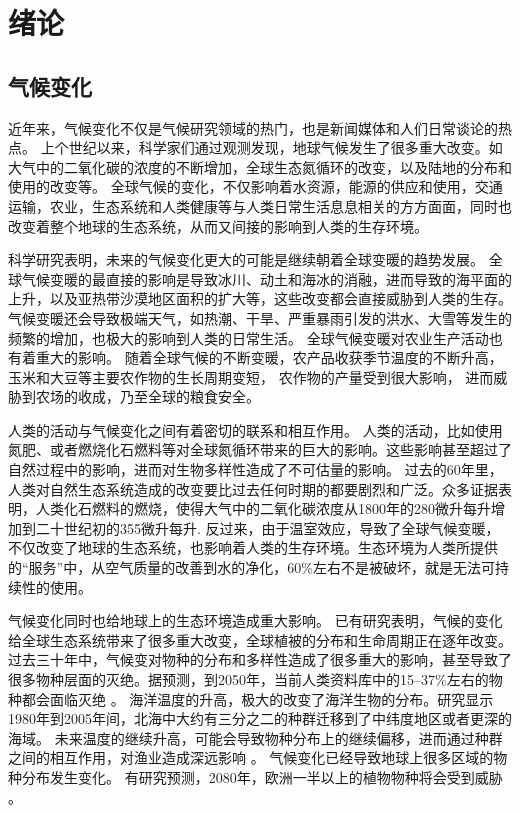\chapter{绪论}
\label{cha:intro}

\section{气候变化}

近年来，气候变化不仅是气候研究领域的热门，也是新闻媒体和人们日常谈论的热点。
上个世纪以来，科学家们通过观测发现，地球气候发生了很多重大改变。如大气中的二氧化碳的浓度的不断增加，全球生态氮循环的改变，以及陆地的分布和使用的改变等\cite{vitousek1994beyond}。
全球气候的变化，不仅影响着水资源，能源的供应和使用，交通运输，农业，生态系统和人类健康等与人类日常生活息息相关的方方面面\cite{karl2009global}，同时也改变着整个地球的生态系统，从而又间接的影响到人类的生存环境。



科学研究表明，未来的气候变化更大的可能是继续朝着全球变暖的趋势发展\cite{solomon2007climate,stocker2013ipcc}。
全球气候变暖的最直接的影响是导致冰川、动土和海冰的消融，进而导致的海平面的上升，以及亚热带沙漠地区面积的扩大等，这些改变都会直接威胁到人类的生存。
气候变暖还会导致极端天气，如热潮、干旱、严重暴雨引发的洪水、大雪等发生的频繁的增加，也极大的影响到人类的日常生活。
全球气候变暖对农业生产活动也有着重大的影响。 随着全球气候的不断变暖，农产品收获季节温度的不断升高，玉米和大豆等主要农作物的生长周期变短， 农作物的产量受到很大影响， 进而威胁到农场的收成，乃至全球的粮食安全\cite{battisti2009historical,adams1990global,smith1989potential}。 

人类的活动与气候变化之间有着密切的联系和相互作用。
人类的活动，比如使用氮肥、或者燃烧化石燃料等对全球氮循环带来的巨大的影响。这些影响甚至超过了自然过程中的影响，进而对生物多样性造成了不可估量的影响。
过去的60年里，人类对自然生态系统造成的改变要比过去任何时期的都要剧烈和广泛。众多证据表明，人类化石燃料的燃烧，使得大气中的二氧化碳浓度从1800年的280微升每升增加到二十世纪初的355微升每升\cite{vitousek1994beyond}. 
反过来，由于温室效应，导致了全球气候变暖，不仅改变了地球的生态系统，也影响着人类的生存环境。生态环境为人类所提供的“服务”中，从空气质量的改善到水的净化，60\%左右不是被破坏，就是无法可持续性的使用\cite{assessment2005ecosystems}。



气候变化同时也给地球上的生态环境造成重大影响。
已有研究表明，气候的变化给全球生态系统带来了很多重大改变，全球植被的分布和生命周期正在逐年改变\cite{parmesan2003globally}。
过去三十年中，气候变对物种的分布和多样性造成了很多重大的影响，甚至导致了很多物种层面的灭绝。据预测，到2050年，当前人类资料库中的15–37\%左右的物种都会面临灭绝 \cite{thomas2004extinction} 。
海洋温度的升高，极大的改变了海洋生物的分布。研究显示1980年到2005年间，北海中大约有三分之二的种群迁移到了中纬度地区或者更深的海域。
未来温度的继续升高，可能会导致物种分布上的继续偏移，进而通过种群之间的相互作用，对渔业造成深远影响\cite{perry2005climate} 。
气候变化已经导致地球上很多区域的物种分布发生变化。 
有研究预测，2080年，欧洲一半以上的植物物种将会受到威胁\cite{thuiller2005climate} 。

